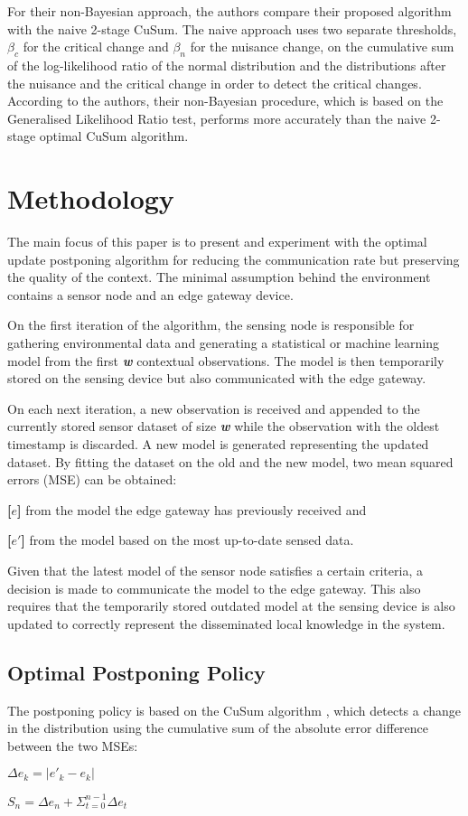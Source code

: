 \documentclass{mpaper}
\begin{document}
For their non-Bayesian approach, the authors compare their proposed algorithm with the naive 2-stage CuSum. The naive approach uses two separate thresholds, $\beta_c$ for the critical change and $\beta_n$ for the nuisance change, on the cumulative sum of the log-likelihood ratio of the normal distribution and the distributions after the nuisance and the critical change in order to detect the critical changes.
According to the authors, their non-Bayesian procedure, which is based on the Generalised Likelihood Ratio test, performs more accurately than the naive 2-stage optimal CuSum algorithm.

\section{Methodology}

The main focus of this paper is to present and experiment with the optimal update postponing algorithm for reducing the communication rate but preserving the quality of the context. 
The minimal assumption behind the environment contains a sensor node and an edge gateway device. 

On the first iteration of the algorithm, the sensing node is responsible for gathering environmental data and generating a statistical or machine learning model from the first \textbf{\emph{w}} contextual observations. The model is then temporarily stored on the sensing device but also communicated with the edge gateway.

On each next iteration, a new observation is received and appended to the currently stored sensor dataset of size \textbf{\emph{w}} while the observation with the oldest timestamp is discarded. A new model is generated representing the updated dataset. By fitting the dataset on the old and the new model, two mean squared errors (MSE) can be obtained:

\textbf{[$e$]} from the model the edge gateway has previously received and

\textbf{[$e'$]} from the model based on the most up-to-date sensed data.

Given that the latest model of the sensor node satisfies a certain criteria, a decision is made to communicate the model to the edge gateway. This also requires that the temporarily stored outdated model at the sensing device is also updated to correctly represent the disseminated local knowledge in the system.

\subsection*{Optimal Postponing Policy}
The postponing policy is based on the CuSum algorithm \cite{page1954}, which detects a change in the distribution using the cumulative sum of the absolute error difference between the two MSEs:
\begin{center}
    $\Delta e_k = | e'_k - e_k |$
    
    $S_n = \Delta e_n + \Sigma_{t=0}^{n-1} \Delta e_t$
\end{center}
\end{document}
